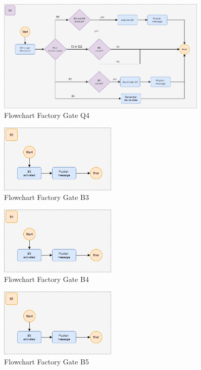 \begin{figure}[H]
    \centering
    \includegraphics[width=0.9\textwidth]{images/flowchart_factory_gate_q4.png}
    \caption{Flowchart Factory Gate Q4}
    \label{fig:FlowChartFactoryDoorQ4}
\end{figure}

\begin{figure}[H]
    \centering
    \includegraphics[width=0.5\textwidth]{images/flowchart_factory_gate_b3.png}
    \caption{Flowchart Factory Gate B3}
    \label{fig:FlowChartFactoryDoorB3}
\end{figure}

\begin{figure}[H]
    \centering
    \includegraphics[width=0.5\textwidth]{images/flowchart_factory_gate_b4.png}
    \caption{Flowchart Factory Gate B4}
    \label{fig:FlowChartFactoryDoorB4}
\end{figure}

\begin{figure}[H]
    \centering
    \includegraphics[width=0.5\textwidth]{images/flowchart_factory_gate_b5.png}
    \caption{Flowchart Factory Gate B5}
    \label{fig:FlowChartFactoryDoorB5}
\end{figure}

